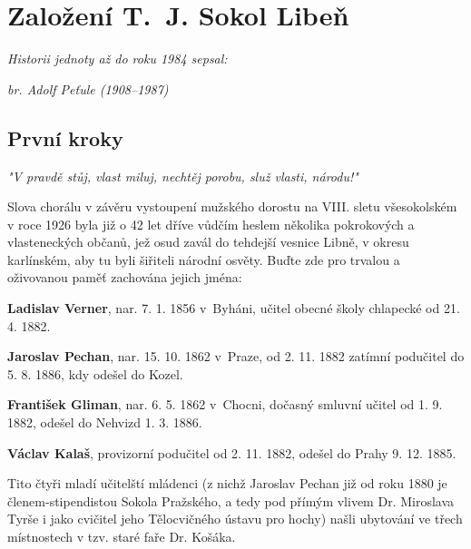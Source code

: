 \documentclass[a5paper, 11pt, twoside]{article}
\begin{document}
\clearpage

\section{Založení T.~J. Sokol Libeň}
\begin{center}
  \textit{Historii jednoty až do roku 1984 sepsal:}
  
  \textit{br. Adolf Peťule (1908–1987)}
\end{center}

\subsection{První kroky}

\vspace{6pt}
\begin{center}
  \textit{"V pravdě stůj, vlast miluj, nechtěj porobu, služ vlasti, národu!"}%
\end{center}

\noindent Slova chorálu v závěru vystoupení mužského dorostu na VIII. sletu
všesokolském v roce 1926 byla již o 42 let dříve vůdčím heslem několika
pokrokových a vlasteneckých občanů, jež osud zavál do tehdejší vesnice
Libně, v okresu karlínském, aby tu byli šiřiteli národní osvěty. Buďte
zde pro trvalou a oživovanou paměť zachována jejich jména:

\textbf{Ladislav Verner}, nar. 7. 1. 1856 v~Byháni, učitel obecné školy chlapecké od 21. 4. 1882.

\textbf{Jaroslav Pechan}, nar. 15. 10. 1862 v~Praze, od 2. 11. 1882 zatímní podučitel do 5. 8. 1886, kdy odešel do Kozel.

\textbf{František Gliman}, nar. 6. 5. 1862 v~Chocni, dočasný smluvní učitel od 1. 9. 1882, odešel do Nehvizd 1. 3. 1886.

\textbf{Václav Kalaš}, provizorní podučitel od 2. 11. 1882, odešel do Prahy 9. 12. 1885.

Tito čtyři mladí učitelští mládenci (z nichž Jaroslav Pechan již od roku
1880 je členem-stipendistou Sokola Pražského, a tedy pod přímým vlivem
Dr. Miroslava Tyrše i jako cvičitel jeho Tělocvičného ústavu pro hochy)
našli ubytování ve třech místnostech v tzv. staré faře Dr. Košáka.
\end{document}

